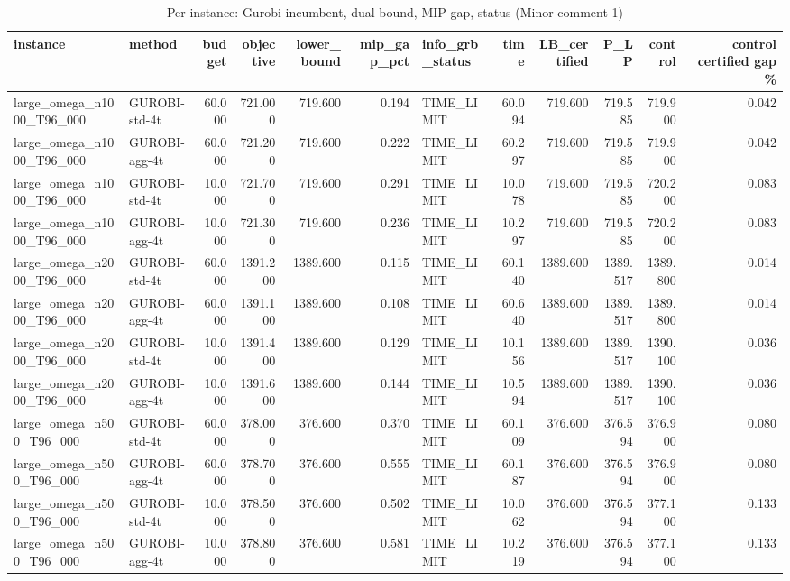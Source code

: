 \begin{table}[htbp]
\centering
\small
\caption{Per instance: Gurobi incumbent, dual bound, MIP gap, status (Minor comment 1)}
\label{tab:E7_gurobi_threads_gurobi_per_instance}
\begin{tabular}{llrrrrlrrrrr}
\toprule
instance & method & budget & objective & lower\_bound & mip\_gap\_pct & info\_grb\_status & time & LB\_certified & P\_LP & control & control certified gap \% \\
\midrule
large\_omega\_n1000\_T96\_000 & GUROBI-std-4t & 60.000 & 721.000 & 719.600 & 0.194 & TIME\_LIMIT & 60.094 & 719.600 & 719.585 & 719.900 & 0.042 \\
large\_omega\_n1000\_T96\_000 & GUROBI-agg-4t & 60.000 & 721.200 & 719.600 & 0.222 & TIME\_LIMIT & 60.297 & 719.600 & 719.585 & 719.900 & 0.042 \\
large\_omega\_n1000\_T96\_000 & GUROBI-std-4t & 10.000 & 721.700 & 719.600 & 0.291 & TIME\_LIMIT & 10.078 & 719.600 & 719.585 & 720.200 & 0.083 \\
large\_omega\_n1000\_T96\_000 & GUROBI-agg-4t & 10.000 & 721.300 & 719.600 & 0.236 & TIME\_LIMIT & 10.297 & 719.600 & 719.585 & 720.200 & 0.083 \\
large\_omega\_n2000\_T96\_000 & GUROBI-std-4t & 60.000 & 1391.200 & 1389.600 & 0.115 & TIME\_LIMIT & 60.140 & 1389.600 & 1389.517 & 1389.800 & 0.014 \\
large\_omega\_n2000\_T96\_000 & GUROBI-agg-4t & 60.000 & 1391.100 & 1389.600 & 0.108 & TIME\_LIMIT & 60.640 & 1389.600 & 1389.517 & 1389.800 & 0.014 \\
large\_omega\_n2000\_T96\_000 & GUROBI-std-4t & 10.000 & 1391.400 & 1389.600 & 0.129 & TIME\_LIMIT & 10.156 & 1389.600 & 1389.517 & 1390.100 & 0.036 \\
large\_omega\_n2000\_T96\_000 & GUROBI-agg-4t & 10.000 & 1391.600 & 1389.600 & 0.144 & TIME\_LIMIT & 10.594 & 1389.600 & 1389.517 & 1390.100 & 0.036 \\
large\_omega\_n500\_T96\_000 & GUROBI-std-4t & 60.000 & 378.000 & 376.600 & 0.370 & TIME\_LIMIT & 60.109 & 376.600 & 376.594 & 376.900 & 0.080 \\
large\_omega\_n500\_T96\_000 & GUROBI-agg-4t & 60.000 & 378.700 & 376.600 & 0.555 & TIME\_LIMIT & 60.187 & 376.600 & 376.594 & 376.900 & 0.080 \\
large\_omega\_n500\_T96\_000 & GUROBI-std-4t & 10.000 & 378.500 & 376.600 & 0.502 & TIME\_LIMIT & 10.062 & 376.600 & 376.594 & 377.100 & 0.133 \\
large\_omega\_n500\_T96\_000 & GUROBI-agg-4t & 10.000 & 378.800 & 376.600 & 0.581 & TIME\_LIMIT & 10.219 & 376.600 & 376.594 & 377.100 & 0.133 \\

\end{tabular}
\end{table}

